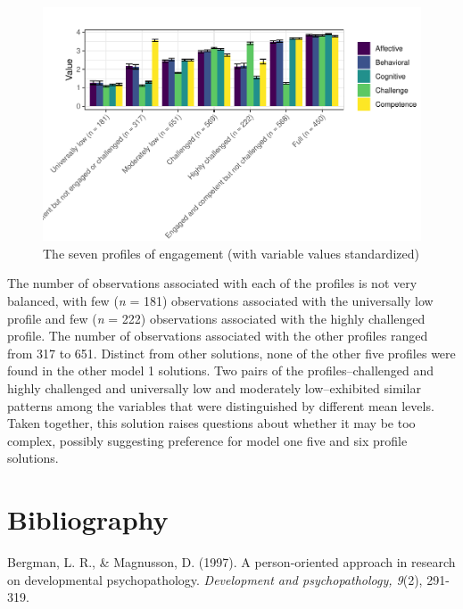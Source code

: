 \documentclass[]{msu-thesis}
\theoremstyle{definition}
\theoremstyle{definition}
\theoremstyle{definition}
\theoremstyle{remark}
\begin{document}
\begin{appendices}
\begin{figure}
{\centering \includegraphics[width=1\linewidth]{rosenberg-dissertation_files/figure-latex/unnamed-chunk-19-1}

}

\caption{The seven profiles of engagement (with variable values standardized)}\label{fig:unnamed-chunk-19}
\end{figure}

The number of observations associated with each of the profiles is not
very balanced, with few (\emph{n} = 181) observations associated with
the universally low profile and few (\emph{n} = 222) observations
associated with the highly challenged profile. The number of
observations associated with the other profiles ranged from 317 to 651.
Distinct from other solutions, none of the other five profiles were
found in the other model 1 solutions. Two pairs of the
profiles--challenged and highly challenged and universally low and
moderately low--exhibited similar patterns among the variables that were
distinguished by different mean levels. Taken together, this solution
raises questions about whether it may be too complex, possibly
suggesting preference for model one five and six profile solutions.
\end{appendices}

\makebibliographypage
\SingleSpace
\setlength{\parindent}{-0.2in} \setlength{\leftskip}{0.2in}
\setlength{\parskip}{12pt}
\chapter*{Bibliography}\label{bibliography}
Bergman, L. R., \& Magnusson, D. (1997). A person-oriented approach in
research on developmental psychopathology. \emph{Development and
psychopathology, 9}(2), 291-319.
\end{document}
